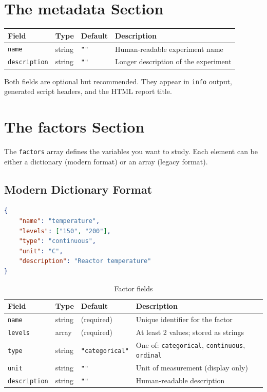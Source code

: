 \documentclass[11pt]{book}
\begin{document}
\section{The metadata Section}

\begin{table}[H]
\centering
\begin{tabular}{@{}lllp{5cm}@{}}
\toprule
\textbf{Field} & \textbf{Type} & \textbf{Default} & \textbf{Description} \\
\midrule
\texttt{name} & string & \texttt{""} & Human-readable experiment name \\
\texttt{description} & string & \texttt{""} & Longer description of the experiment \\
\bottomrule
\end{tabular}
\end{table}

Both fields are optional but recommended. They appear in \texttt{info} output, generated script headers, and the HTML report title.

\section{The factors Section}
\label{sec:factors}

The \texttt{factors} array defines the variables you want to study. Each element can be either a dictionary (modern format) or an array (legacy format).

\subsection{Modern Dictionary Format}

\begin{lstlisting}[language=json]
{
    "name": "temperature",
    "levels": ["150", "200"],
    "type": "continuous",
    "unit": "C",
    "description": "Reactor temperature"
}
\end{lstlisting}

\begin{table}[H]
\centering
\caption{Factor fields}
\begin{tabular}{@{}lllp{5cm}@{}}
\toprule
\textbf{Field} & \textbf{Type} & \textbf{Default} & \textbf{Description} \\
\midrule
\texttt{name} & string & (required) & Unique identifier for the factor \\
\texttt{levels} & array & (required) & At least 2 values; stored as strings \\
\texttt{type} & string & \texttt{"categorical"} & One of: \texttt{categorical}, \texttt{continuous}, \texttt{ordinal} \\
\texttt{unit} & string & \texttt{""} & Unit of measurement (display only) \\
\texttt{description} & string & \texttt{""} & Human-readable description \\
\bottomrule
\end{tabular}
\end{table}
\end{document}

